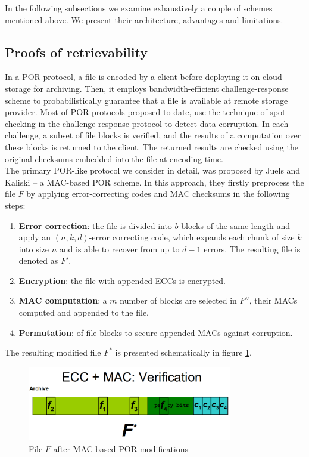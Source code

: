 In the following subsections we examine exhaustively a couple of schemes
mentioned above. We present their architecture, advantages and limitations.

		\subsection{Proofs of retrievability}
In a POR \cite{por, por2} protocol, a file is encoded by a client before
deploying it on cloud storage for archiving. Then, it employs
bandwidth-efficient challenge-response scheme to probabilistically guarantee
that a file is available at remote storage provider. Most of POR protocols 
proposed to date, use the technique of spot-checking in the challenge-response
protocol to detect data corruption. In each challenge, a subset of file blocks
is verified, and the results of a computation over these blocks is returned to
the client. The returned results are checked using the original checksums
embedded into the file at encoding time.\\

The primary POR-like protocol we consider in detail, was proposed by Juels and
Kaliski \cite{por} -- a MAC-based POR scheme. In this approach, they firstly
preprocess the file $F$ by applying error-correcting codes and MAC checksums
in the following steps:

\begin{enumerate}
	\item \textbf{Error correction}: the file is divided into $b$ blocks of the
	same length and apply an $(n,k,d)$-error correcting code,
	which expands each chunk of size $k$ into size $n$ and is able to recover
	from up to $d-1$ errors. The resulting file is denoted as $F'$.
	\item \textbf{Encryption}: the file with appended ECCs is encrypted.
	\item \textbf{MAC computation}: a $m$ number of blocks are selected in
	$F''$, their MACs computed and appended to the file.
	\item \textbf{Permutation}: of file blocks to secure appended MACs against
	corruption.
\end{enumerate}

The resulting modified file $F^{*}$ is presented schematically in figure 
\ref{fig:por-modified-file}.\\

\begin{figure}[h!]
	\centering
	\includegraphics[width=0.8\textwidth]{images/modified-file.png}
	\caption{File $F$ after MAC-based POR modifications \cite{por}}
	\label{fig:por-modified-file}
\end{figure}

